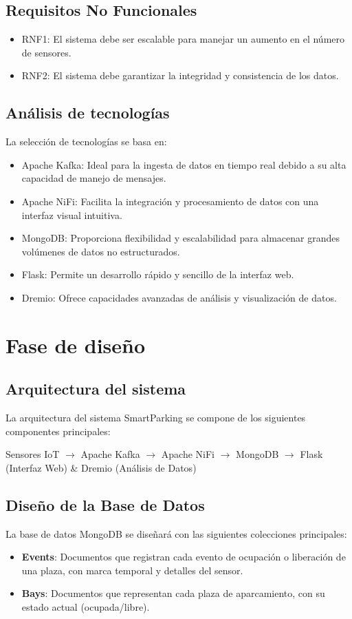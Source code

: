 \documentclass{../../../miPlantilla}
\begin{document}
\subsection{Requisitos No Funcionales}
\begin{itemize}
  \item RNF1: El sistema debe ser escalable para manejar un aumento en el número de sensores.
  \item RNF2: El sistema debe garantizar la integridad y consistencia de los datos.
\end{itemize}

\subsection{Análisis de tecnologías}
La selección de tecnologías se basa en:

\begin{itemize}
  \item Apache Kafka: Ideal para la ingesta de datos en tiempo real debido a su alta capacidad de manejo de mensajes.
  \item Apache NiFi: Facilita la integración y procesamiento de datos con una interfaz visual intuitiva.
  \item MongoDB: Proporciona flexibilidad y escalabilidad para almacenar grandes volúmenes de datos no estructurados.
  \item Flask: Permite un desarrollo rápido y sencillo de la interfaz web.
  \item Dremio: Ofrece capacidades avanzadas de análisis y visualización de datos.
\end{itemize}

\section{Fase de diseño}
\subsection{Arquitectura del sistema}
La arquitectura del sistema SmartParking se compone de los siguientes componentes principales:

Sensores IoT $\rightarrow$ Apache Kafka $\rightarrow$ Apache NiFi $\rightarrow$ MongoDB $\rightarrow$ Flask (Interfaz Web) \& Dremio (Análisis de Datos)

\subsection{Diseño de la Base de Datos}
La base de datos MongoDB se diseñará con las siguientes colecciones principales:
\begin{itemize}
  \item \textbf{Events}: Documentos que registran cada evento de ocupación o liberación de una plaza, con marca temporal y detalles del sensor.
  \item \textbf{Bays}: Documentos que representan cada plaza de aparcamiento, con su estado actual (ocupada/libre).
\end{itemize}
\end{document}
